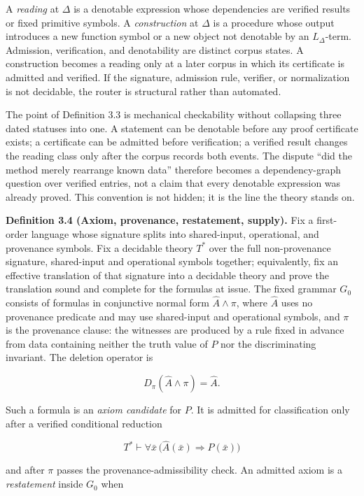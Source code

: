 \documentclass[10pt,twocolumn]{article}
\begin{document}
A \emph{reading} at \(\Delta\) is a denotable expression whose
dependencies are verified results or fixed primitive symbols. A
\emph{construction} at \(\Delta\) is a procedure whose output introduces
a new function symbol or a new object not denotable by an
\(L_\Delta\)-term. Admission, verification, and denotability are
distinct corpus states. A construction becomes a reading only at a later
corpus in which its certificate is admitted and verified. If the
signature, admission rule, verifier, or normalization is not decidable,
the router is structural rather than automated.

The point of Definition 3.3 is mechanical checkability without
collapsing three dated statuses into one. A statement can be denotable
before any proof certificate exists; a certificate can be admitted
before verification; a verified result changes the reading class only
after the corpus records both events. The dispute ``did the method
merely rearrange known data'' therefore becomes a dependency-graph
question over verified entries, not a claim that every denotable
expression was already proved. This convention is not hidden; it is the
line the theory stands on.

\textbf{Definition 3.4 (Axiom, provenance, restatement, supply).} Fix a
first-order language whose signature splits into shared-input,
operational, and provenance symbols. Fix a decidable theory \(T^*\) over
the full non-provenance signature, shared-input and operational symbols
together; equivalently, fix an effective translation of that signature
into a decidable theory and prove the translation sound and complete for
the formulas at issue. The fixed grammar \(G_0\) consists of formulas in
conjunctive normal form \(\widehat{A} \wedge \pi\), where
\(\widehat{A}\) uses no provenance predicate and may use shared-input
and operational symbols, and \(\pi\) is the provenance clause: the
witnesses are produced by a rule fixed in advance from data containing
neither the truth value of \(P\) nor the discriminating invariant. The
deletion operator is

\[D_\pi(\widehat{A} \wedge \pi) = \widehat{A}.\]

Such a formula is an \emph{axiom candidate} for \(P\). It is admitted
for classification only after a verified conditional reduction

\[T^* \vdash \forall \bar{x}\, \bigl( \widehat{A}(\bar{x}) \Rightarrow P(\bar{x}) \bigr)\]

and after \(\pi\) passes the provenance-admissibility check. An admitted
axiom is a \emph{restatement} inside \(G_0\) when
\end{document}
